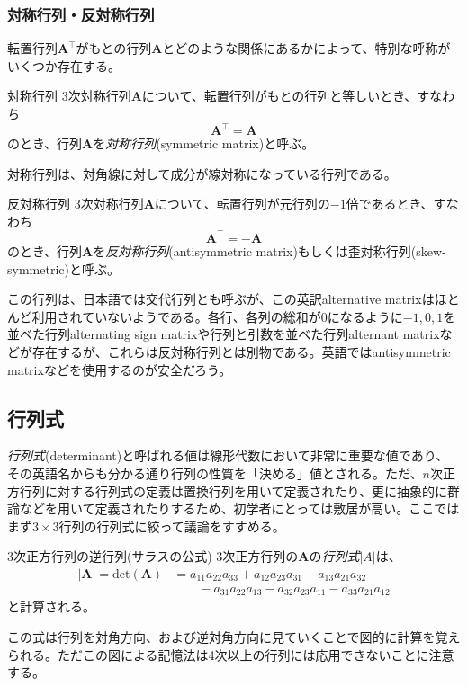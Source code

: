 \subsubsection{対称行列・反対称行列}
転置行列\(\boldsymbol{A}^{\top}\)がもとの行列\(\boldsymbol{A}\)とどのような関係にあるかによって、特別な呼称がいくつか存在する。
\begin{definition*}{対称行列}
	3次対称行列\(\boldsymbol{A}\)について、転置行列がもとの行列と等しいとき、すなわち
	\begin{equation}
		\boldsymbol{A}^{\top}= \boldsymbol{A}
	\end{equation}
	のとき、行列\(\boldsymbol{A}\)を\emph{対称行列}(symmetric matrix)と呼ぶ。
\end{definition*}
対称行列は、対角線に対して成分が線対称になっている行列である。
\begin{definition*}{反対称行列}
	3次対称行列\(\boldsymbol{A}\)について、転置行列が元行列の\(-1\)倍であるとき、すなわち
	\begin{equation}
		\boldsymbol{A}^{\top}= -\boldsymbol{A}
	\end{equation}
	のとき、行列\(\boldsymbol{A}\)を\emph{反対称行列}(antisymmetric matrix)もしくは歪対称行列(skew-symmetric)と呼ぶ。
\end{definition*}
この行列は、日本語では交代行列とも呼ぶが、この英訳alternative matrixはほとんど利用されていないようである。各行、各列の総和が\(0\)になるように\(-1,0,1\)を並べた行列alternating sign matrixや行列と引数を並べた行列alternant matrixなどが存在するが、これらは反対称行列とは別物である。英語ではantisymmetric matrixなどを使用するのが安全だろう。

\subsection{行列式}
\emph{行列式}(determinant)と呼ばれる値は線形代数において非常に重要な値であり、その英語名からも分かる通り行列の性質を「決める」値とされる。ただ、\(n\)次正方行列に対する行列式の定義は置換行列を用いて定義されたり、更に抽象的に群論などを用いて定義されたりするため、初学者にとっては敷居が高い。ここではまず\(3\times 3\)行列の行列式に絞って議論をすすめる。
\begin{definition*}{3次正方行列の逆行列(サラスの公式)}
	3次正方行列の\(\boldsymbol{A}\)の\emph{行列式}\(|A|\)は、
	\begin{equation}
		\begin{aligned}
			|\boldsymbol{A}|=\mathrm{det}(\boldsymbol{A}) & =
			a_{11}a_{22}a_{33}+a_{12}a_{23}a_{31}+a_{13}a_{21}a_{32} \\&\qquad-a_{31}a_{22}a_{13}-a_{32}a_{23}a_{11}-a_{33}a_{21}a_{12}
		\end{aligned}
	\end{equation}
	と計算される。
\end{definition*}
この式は行列を対角方向、および逆対角方向に見ていくことで図的に計算を覚えられる。ただこの図による記憶法は4次以上の行列には応用できないことに注意する。

